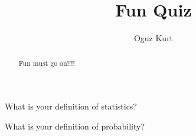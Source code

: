 \documentclass{ximera}
\title{Fun Quiz}
\author{Oguz Kurt}
\begin{document}
\begin{abstract}
Fun must go on!!!!
\end{abstract}
\maketitle

\begin{problem}
What is your definition of statistics?

\begin{freeResponse}
\end{freeResponse}
\end{problem}

\begin{problem}
What is your definition of probability?

\begin{freeResponse}
\end{freeResponse}
\end{problem}
\end{document}
